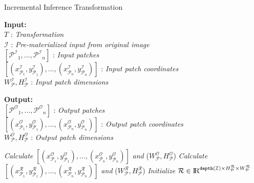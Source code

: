 \begin{algorithm}
    \caption{Incremental Inference Transformation}\label{euclid}
    \label{alg:incinference}
    \begin{flushleft}
     \hspace*{4mm} \textbf{Input:} \\
     \hspace*{8mm} $T$ : \textit{Transformation}\\
     \hspace*{8mm} $\mathcal{I}$ : \textit{Pre-materialized input from original image}\\
     \hspace*{8mm} $[\mathcal{P^I}_1,...,\mathcal{P^I}_n]$ : \textit{Input patches}\\
     \hspace*{8mm} $[(x^\mathcal{I}_{\mathcal{P}_1},y^\mathcal{I}_{\mathcal{P}_1}),...,(x^\mathcal{I}_{\mathcal{P}_n},y^\mathcal{I}_{\mathcal{P}_n})]$ : \textit{Input patch coordinates}\\
     \hspace*{8mm} $W^\mathcal{I}_\mathcal{P},H^\mathcal{I}_\mathcal{P}$ : \textit{Input patch dimensions}
    \end{flushleft}

	\begin{flushleft}
     \hspace*{4mm} \textbf{Output:}\\
     \hspace*{8mm} $[\mathcal{P^O}_1,...,\mathcal{P^O}_n]$ : \textit{Output patches}\\
     \hspace*{8mm} $[(x^\mathcal{O}_{\mathcal{P}_1},y^\mathcal{O}_{\mathcal{P}_1}),...,(x^\mathcal{O}_{\mathcal{P}_n},y^\mathcal{O}_{\mathcal{P}_n})]$ : \textit{Output patch coordinates}\\
     \hspace*{8mm} $W^\mathcal{O}_\mathcal{P},H^\mathcal{O}_\mathcal{P}$ : \textit{Output patch dimensions}
    \end{flushleft}

    \begin{algorithmic}[1]
    \State \textit{Calculate} $[(x^\mathcal{O}_{\mathcal{P}_1},y^\mathcal{O}_{\mathcal{P}_1}),...,(x^\mathcal{O}_{\mathcal{P}_n},y^\mathcal{O}_{\mathcal{P}_n})]$ \textit{and} ($W^\mathcal{O}_\mathcal{P},H^\mathcal{O}_\mathcal{P}$)
    \State \textit{Calculate} $[(x^\mathcal{R}_{\mathcal{P}_1},y^\mathcal{R}_{\mathcal{P}_1}),...,(x^\mathcal{R}_{\mathcal{P}_n},y^\mathcal{R}_{\mathcal{P}_n})]$ \textit{and} ($W^\mathcal{R}_\mathcal{P},H^\mathcal{R}_\mathcal{P}$)
    \State \textit{Initialize} $\mathcal{R} \in \mathcal{\rm I\!R}^{\texttt{depth}(\mathcal{I}) \times H^\mathcal{R}_\mathcal{P} \times W^\mathcal{R}_\mathcal{P}}$


\end{algorithmic}
\end{algorithm}
